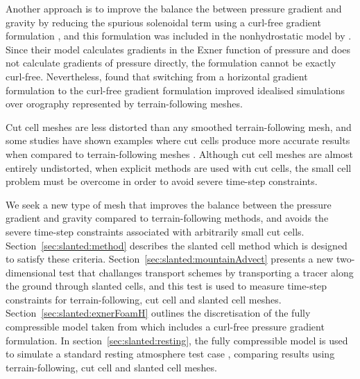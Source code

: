 Another approach is to improve the balance the between pressure gradient and gravity by reducing the spurious solenoidal term using a curl-free gradient formulation \citep{thuburn-cotter2012}, and this formulation was included in the nonhydrostatic model by \citet{weller-shahrokhi2014}.
Since their model calculates gradients in the Exner function of pressure and does not calculate gradients of pressure directly, the formulation cannot be exactly curl-free.
Nevertheless, \citet{weller-shahrokhi2014} found that switching from a horizontal gradient formulation to the curl-free gradient formulation improved idealised simulations over orography represented by terrain-following meshes.

Cut cell meshes are less distorted than any smoothed terrain-following mesh, and some studies have shown examples where cut cells produce more accurate results when compared to terrain-following meshes \citep{good2014,steppeler2013}.
Although cut cell meshes are almost entirely undistorted, when explicit methods are used with cut cells, the small cell problem must be overcome in order to avoid severe time-step constraints.

We seek a new type of mesh that improves the balance between the pressure gradient and gravity compared to terrain-following methods, and avoids the severe time-step constraints associated with arbitrarily small cut cells.  Section~\ref{sec:slanted:method} describes the slanted cell method which is designed to satisfy these criteria.
Section~\ref{sec:slanted:mountainAdvect} presents a new two-dimensional test that challanges transport schemes by transporting a tracer along the ground through slanted cells, and this test is used to measure time-step constraints for terrain-following, cut cell and slanted cell meshes.
Section~\ref{sec:slanted:exnerFoamH} outlines the discretisation of the fully compressible model taken from \citet{weller-shahrokhi2014} which includes a curl-free pressure gradient formulation.
In section~\ref{sec:slanted:resting}, the fully compressible model is used to simulate a standard resting atmosphere test case \citep{klemp2011}, comparing results using terrain-following, cut cell and slanted cell meshes.






